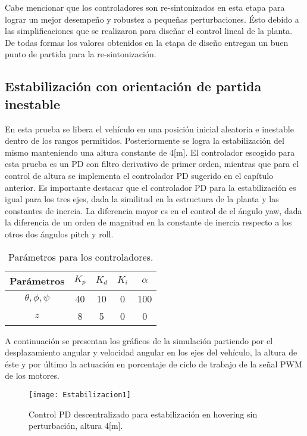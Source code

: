 \documentclass[../main.tex]{subfiles}
\begin{document}
Cabe mencionar que los controladores son re-sintonizados en esta etapa
para lograr un mejor desempeño y robustez a pequeñas perturbaciones.
Ésto debido a las simplificaciones que se realizaron para diseñar
el control lineal de la planta. De todas formas los valores obtenidos
en la etapa de diseño entregan un buen punto de partida para la re-sintonización.

\subsection{Estabilización con orientación de partida inestable}

En esta prueba se libera el vehículo en una posición inicial aleatoria
e inestable dentro de los rangos permitidos. Posteriormente se logra
la estabilización del mismo manteniendo una altura constante de 4{[}m{]}.
El controlador escogido para esta prueba es un PD con filtro derivativo
de primer orden, mientras que para el control de altura se implementa
el controlador PD sugerido en el capítulo anterior. Es importante destacar
que el controlador PD para la estabilización es igual para los tres
ejes, dada la similitud en la estructura de la planta y las constantes
de inercia. La diferencia mayor es en el control de el ángulo yaw,
dada la diferencia de un orden de magnitud en la constante de inercia
respecto a los otros dos ángulos pitch y roll.

\begin{table}[H]
\noindent \begin{centering}
\begin{tabular}{|c|c|c|c|c|}
\hline 
Parámetros & $K_{p}$ & $K_{d}$ & $K_{i}$ & $\alpha$\tabularnewline
\hline 
\hline 
$\theta,\phi,\psi$ & 40 & 10 & 0 & 100\tabularnewline
\hline 
$z$ & 8 & 5 & 0 & 0\tabularnewline
\hline 
\end{tabular}
\par\end{centering}
\caption{Parámetros para los controladores.\label{tab:kp kd ki alpha}}
\end{table}

A continuación se presentan los gráficos de la simulación partiendo por el desplazamiento angular y velocidad angular en los ejes del vehículo, la altura de éste y por último la actuación en porcentaje de ciclo de trabajo de la señal PWM de los motores.

\begin{figure}[H]
\noindent \begin{centering}
\texttt{[image: Estabilizacion1]}
\par\end{centering}
\caption{Control PD descentralizado para estabilización en hovering sin perturbación,
altura 4{[}m{]}.}
\end{figure}
\end{document}
